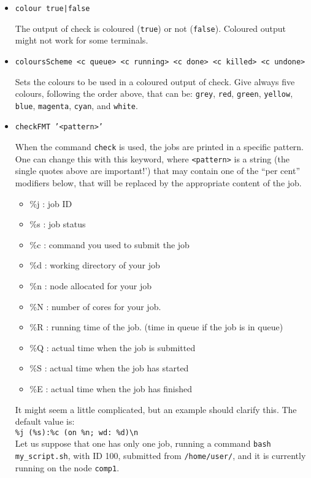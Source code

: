 \documentclass[a4paper,12pt]{article}
\begin{document}
\begin{itemize}
\item \texttt{colour true|false}
  
  The output of check is coloured (\texttt{true}) or not (\texttt{false}).
  Coloured output might not work for some terminals.

\item \texttt{coloursScheme <c queue> <c running> <c done> <c killed> <c undone>}

  Sets the colours to be used in a coloured output of check.
  Give always five colours, following the order above, that can be:
  \texttt{grey}, \texttt{red}, \texttt{green}, \texttt{yellow}, \texttt{blue}, \texttt{magenta}, \texttt{cyan}, and \texttt{white}.

\item \texttt{checkFMT '<pattern>'}

  When the command \texttt{check} is used, the jobs are printed in a specific pattern.
  One can change this with this keyword, where \texttt{<pattern>} is a string (the single quotes above are important!') that may contain one of the ``per cent'' modifiers below, that will be replaced by the appropriate content of the job.

  \begin{itemize}
  \item \%j : job ID
  \item \%s : job status
  \item \%c : command you used to submit the job
  \item \%d : working directory of your job
  \item \%n : node allocated for your job
  \item \%N : number of cores for your job.
  \item \%R : running time of the job. (time in queue if the job is in queue)
  \item \%Q : actual time when the job is submitted
  \item \%S : actual time when the job has started
  \item \%E : actual time when the job has finished
  \end{itemize}

  It might seem a little complicated, but an example should clarify this.
  The default value is:\\
  \texttt{\%j (\%s):\%c (on \%n; wd: \%d)\textbackslash n}\\
  Let us suppose that one has only one job, running a command \texttt{bash my\_script.sh}, with ID 100, submitted from \texttt{/home/user/}, and it is currently running on the node \texttt{comp1}.


\end{itemize}
\end{document}
